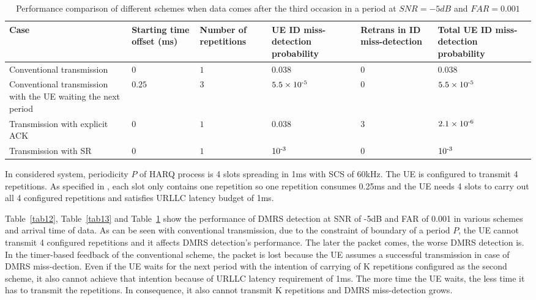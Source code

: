 \documentclass{report}
\begin{document}
\begin{table}[htbp]
\caption{Performance comparison of different schemes when data comes after the third occasion in a period at $SNR = -5dB$ and $FAR = 0.001$}
\begin{center}
\begin{tabular}{|p{6em}|p{4em}|p{4em}|p{4em}|p{4em}|p{4em}|}
 \hline
 \textbf{Case} & \textbf{Starting time offset (ms)}&\textbf{Number of repetitions}&\textbf{UE ID miss-detection probability}&\textbf{Retrans in ID miss-detection}&\textbf{Total UE ID miss-detection probability}\\
 \hline
 Conventional transmission&$0$&$1$&$0.038$&$0$&$0.038$\\
 \hline
  Conventional transmission with the UE waiting the next period&$0.25$&$3$&$5.5\times10\textsuperscript{-5}$&$0$&$5.5\times10\textsuperscript{-5}$\\
 \hline
Transmission with explicit ACK&$0$&$1$&$0.038$&$3$&$2.1\times10\textsuperscript{-6}$\\
\hline
Transmission with SR&$0$&$1$&$10\textsuperscript{-3}$&$0$&$10\textsuperscript{-3}$\\
 \hline
\end{tabular}
\label{tab14}
\end{center}
\end{table}

In considered system, periodicity $P$ of HARQ process is 4 slots spreading in 1ms with SCS of 60kHz. The UE is configured to transmit 4 repetitions. As specified in \cite{ad6}, each slot only contains one repetition so one repetition consumes 0.25ms and the UE needs 4 slots to carry out all 4 configured repetitions and satisfies URLLC latency budget of 1ms.

Table~\ref{tab12}, Table~\ref{tab13} and Table~\ref{tab14} show the performance of DMRS detection at SNR of -5dB and FAR of 0.001 in various schemes and arrival time of data. As can be seen with conventional  transmission, due to the constraint of boundary of a period $P$, the UE cannot transmit 4 configured repetitions and it affects DMRS detection's performance. The later the packet comes, the worse DMRS detection is. In the timer-based feedback of the conventional scheme, the packet is lost because the UE assumes a successful transmission in case of DMRS miss-dection. Even if the UE waits for the next period with the intention of carrying of K repetitions configured as the second scheme, it also cannot achieve that intention because of URLLC latency requirement of 1ms. The more time the UE waits, the less time it has to transmit the repetitions. In consequence, it also cannot transmit K repetitions and DMRS miss-detection grows.
\end{document}
